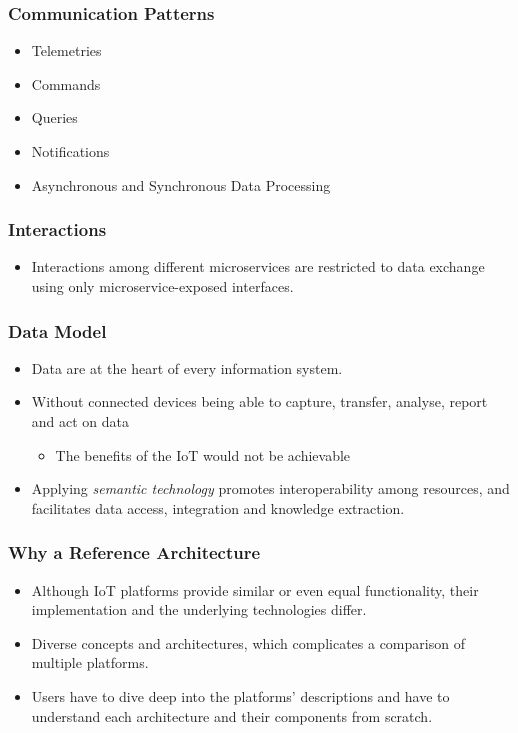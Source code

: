 \documentclass{../iot-lecture}
\begin{document}
\begin{frame}
  \frametitle{Communication Patterns}
  \begin{itemize}
    \item Telemetries
    \item Commands
    \item Queries
    \item Notifications
    \item Asynchronous and Synchronous Data Processing
  \end{itemize}
\end{frame}

\begin{frame}
  \frametitle{Interactions}
  \begin{itemize}
    \item Interactions among different microservices are restricted to data exchange using only microservice-exposed interfaces.
  \end{itemize}
\end{frame}

\begin{frame}
  \frametitle{Data Model}
  \begin{itemize}
    \item Data are at the heart of every information system.
    \item Without connected devices being able to capture, transfer, analyse, report and act on data
    \begin{itemize}
      \item The benefits of the IoT would not be achievable
    \end{itemize}
    \item Applying \textit{\color{YellowOrange} semantic technology} promotes interoperability among resources, and facilitates data access, integration and knowledge extraction.
  \end{itemize}
\end{frame}

\begin{frame}
  \frametitle{Why a Reference Architecture}
  \begin{itemize}
    \item Although IoT platforms provide similar or even equal functionality, their implementation and the underlying technologies differ.
    \item Diverse concepts and architectures, which complicates a comparison of multiple platforms.
    \item Users have to dive deep into the platforms' descriptions and have to understand each architecture and their components from scratch.
  \end{itemize}
\end{frame}
\end{document}
